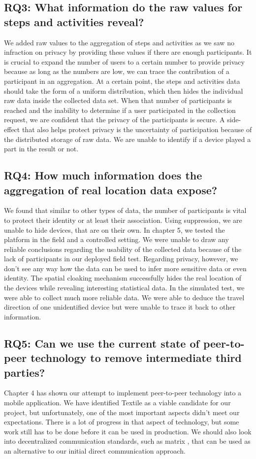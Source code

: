 \subsection*{RQ3: What information do the raw values for steps and activities reveal?}
We added raw values to the aggregation of steps and activities as we saw no infraction on privacy by providing these values if there are enough participants. It is crucial to expand the number of users to a certain number to provide privacy because as long as the numbers are low, we can trace the contribution of a participant in an aggregation. At a certain point, the steps and activities data should take the form of a uniform distribution, which then hides the individual raw data inside the collected data set. When that number of participants is reached and the inability to determine if a user participated in the collection request, we are confident that the privacy of the participants is secure. A side-effect that also helps protect privacy is the uncertainty of participation because of the distributed storage of raw data. We are unable to identify if a device played a part in the result or not.

\subsection*{RQ4: How much information does the aggregation of real location data expose?}
We found that similar to other types of data, the number of participants is vital to protect their identity or at least their association. Using suppression, we are unable to hide devices, that are on their own. In chapter 5, we tested the platform in the field and a controlled setting. We were unable to draw any reliable conclusions regarding the usability of the collected data because of the lack of participants in our deployed field test. Regarding privacy, however, we don't see any way how the data can be used to infer more sensitive data or even identity. The spatial cloaking mechanism successfully hides the real location of the devices while revealing interesting statistical data. In the simulated test, we were able to collect much more reliable data. We were able to deduce the travel direction of one unidentified device but were unable to trace it back to other information.

\subsection*{RQ5: Can we use the current state of peer-to-peer technology to remove intermediate third parties?}
Chapter 4 has shown our attempt to implement peer-to-peer technology into a mobile application. We have identified Textile as a viable candidate for our project, but unfortunately, one of the most important aspects didn't meet our expectations. There is a lot of progress in that aspect of technology, but some work still has to be done before it can be used in production. We should also look into decentralized communication standards, such as matrix
, that can be used as an alternative to our initial direct communication approach.

